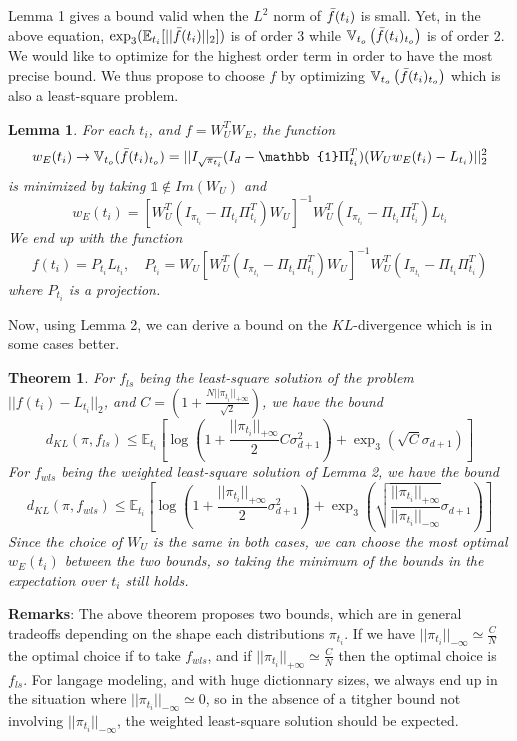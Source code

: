 \documentclass{article}
\newtheorem{theorem}{Theorem}
\newtheorem{lemma}{Lemma}
\begin{document}
Lemma 1 gives a bound valid when the $L^2$ norm of $\Bar{f}(t_i)$ is small. Yet, in the above equation, $\exp_3(\mathbb{E}_{t_i}[||\Bar{f}(t_i)||_2])$ 
is of order 3 while $\mathbb{V}_{t_o}\left(\Bar{f}(t_i)_{t_o}\right)$ is of order 2. We would like to optimize for the highest order term in order to have 
the most precise bound. We thus propose to choose $f$ by optimizing $\mathbb{V}_{t_o}\left(\Bar{f}(t_i)_{t_o}\right)$ which is also a least-square problem.
\bigbreak

\begin{lemma}
    For each $t_i$, and $f = W_U^TW_E$, the function 
    \[w_E(t_i)\rightarrow \mathbb{V}_{t_o}(\Bar{f}(t_i)_{t_o}) = ||I_{\sqrt{\pi_{t_i}}}(I_d - \mathbb{1}\Pi_{t_i}^T)(W_Uw_E({t_i})-L_{t_i})||_2^2\]
    is minimized by taking $\mathbb{1}\notin Im(W_U)$ and \[w_E({t_i}) = [W_U^T(I_{\pi_{t_i}}-\Pi_{t_i}\Pi_{t_i}^T)W_U]^{-1}W_U^T(I_{\pi_{t_i}}-\Pi_{t_i}\Pi_{t_i}^T)L_{t_i}\]
    We end up with the function 
    \[f({t_i}) = P_{t_i}L_{t_i}, \,\,\,\,\,\, P_{t_i} = W_U[W_U^T(I_{\pi_{t_i}}-\Pi_{t_i}\Pi_{t_i}^T)W_U]^{-1}W_U^T(I_{\pi_{t_i}}-\Pi_{t_i}\Pi_{t_i}^T)\]
    where $P_{t_i}$ is a projection.
\end{lemma}
\bigbreak

Now, using Lemma 2, we can derive a bound on the $KL$-divergence which is in some cases better. 
\bigbreak

\begin{theorem}
    For $f_{ls}$ being the least-square solution of the problem $||f({t_i})-L_{t_i}||_2$, and $C = \left(1+\frac{N||\pi_{t_i}||_{+\infty}}{\sqrt{2}}\right)$, we have the bound 
    \[d_{KL}(\pi, f_{ls}) \leq \mathbb{E}_{{t_i}}\left[\log\left(1+\frac{||\pi_{t_i}||_{+\infty}}{2}C\sigma_{d+1}^2\right)
    + \exp_3\left(\sqrt{C}\sigma_{d+1}\right)\right]\]
    For $f_{wls}$ being the weighted least-square solution of Lemma 2, we have the bound
    \[d_{KL}(\pi, f_{wls}) \leq \mathbb{E}_{{t_i}}\left[\log\left(1+\frac{||\pi_{t_i}||_{+\infty}}{2}\sigma_{d+1}^2\right)
    + \exp_3\left(\sqrt{\frac{||\pi_{t_i}||_{+\infty}}{||\pi_{t_i}||_{-\infty}}}\sigma_{d+1}\right)\right]\]
    Since the choice of $W_U$ is the same in both cases, we can choose the most optimal $w_E({t_i})$ between the two bounds, so taking the 
    minimum of the bounds in the expectation over ${t_i}$ still holds.
\end{theorem}
\bigbreak

\textbf{Remarks}: The above theorem proposes two bounds, which are in general tradeoffs depending on the shape each distributions $\pi_{t_i}$. 
If we have $||\pi_{t_i}||_{-\infty} \simeq \frac{C}{N}$ the optimal choice if to take $f_{wls}$, and if 
$||\pi_{t_i}||_{+\infty} \simeq \frac{C}{N}$ then the optimal choice is $f_{ls}$.
For langage modeling, and with huge dictionnary sizes, we always end up in the situation where $||\pi_{t_i}||_{-\infty} \simeq 0$, so 
in the absence of a titgher bound not involving $||\pi_{t_i}||_{-\infty}$, the weighted least-square solution should be expected. 
\bigbreak
\end{document}
